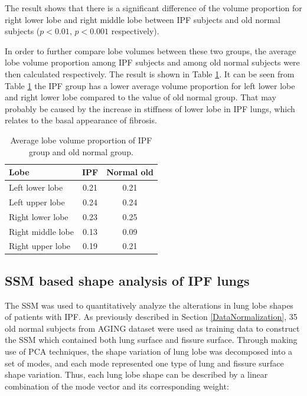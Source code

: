 The result shows that there is a significant difference of the volume proportion for right lower lobe and right middle lobe between IPF subjects and old normal subjects ($p<0.01$, $p<0.001$ respectively). 

In order to further compare lobe volumes between these two groups, the average lobe volume proportion among IPF subjects and among old normal subjects were then calculated respectively. The result is shown in Table \ref{tab:AverageLobeVolume}. It can be seen from Table \ref{tab:AverageLobeVolume} the IPF group has a lower average volume proportion for left lower lobe and right lower lobe compared to the value of old normal group. That may probably be caused by the increase in stiffness of lower lobe in IPF lungs, which relates to the basal appearance of fibrosis.

\begin{table}[htbp]
\centering
\caption{Average lobe volume proportion of IPF group and old normal group.}
\label{tab:AverageLobeVolume}
\begin{tabular}{| l | c | c |}
\hline
\bf{Lobe} & \bf{IPF} & \bf{Normal old} \\
\hline
Left lower lobe & 0.21 & 0.21\\
\hline
Left upper lobe	& 0.24 & 0.24\\
\hline
Right lower lobe	& 0.23 & 0.25\\
\hline
Right middle lobe	& 0.13 & 0.09\\
\hline
Right upper lobe	& 0.19 & 0.21\\
\hline
\end{tabular}
\end{table}

\subsection{SSM based shape analysis of IPF lungs} \label{SSMBasedAnalysis}
The SSM was used to quantitatively analyze the alterations in lung lobe shapes of patients with IPF. As previously described in Section \ref{DataNormalization}, 35 old normal subjects from AGING dataset were used as training data to construct the SSM which contained both lung surface and fissure surface. Through making use of PCA techniques, the shape variation of lung lobe was decomposed into a set of modes, and each mode represented one type of lung and fissure surface shape variation. Thus, each lung lobe shape can be described by a linear combination of the mode vector and its corresponding weight:

